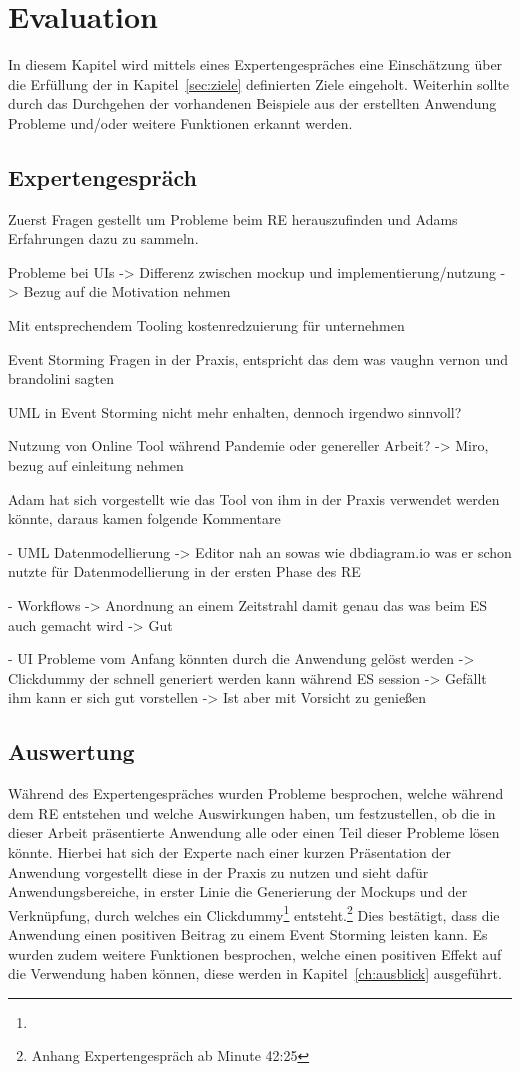 \chapter{Evaluation}\label{ch:evaluation}
In diesem Kapitel wird mittels eines Expertengespräches eine Einschätzung über die Erfüllung der in
Kapitel~\ref{sec:ziele} definierten Ziele eingeholt.
Weiterhin sollte durch das Durchgehen der vorhandenen Beispiele aus der erstellten Anwendung Probleme und/oder weitere
Funktionen erkannt werden.

\section{Expertengespräch}\label{sec:expertengespraech}
Zuerst Fragen gestellt um Probleme beim RE herauszufinden und Adams Erfahrungen dazu zu sammeln.

Probleme bei UIs -> Differenz zwischen mockup und implementierung/nutzung -> Bezug auf die Motivation nehmen

Mit entsprechendem Tooling kostenredzuierung für unternehmen

Event Storming Fragen in der Praxis, entspricht das dem was vaughn vernon und brandolini sagten

UML in Event Storming nicht mehr enhalten, dennoch irgendwo sinnvoll?

Nutzung von Online Tool während Pandemie oder genereller Arbeit? -> Miro, bezug auf einleitung nehmen

Adam hat sich vorgestellt wie das Tool von ihm in der Praxis verwendet werden könnte, daraus kamen folgende Kommentare

- UML Datenmodellierung -> Editor nah an sowas wie dbdiagram.io was er schon nutzte für Datenmodellierung in der ersten Phase des RE

- Workflows -> Anordnung an einem Zeitstrahl damit genau das was beim ES auch gemacht wird -> Gut

- UI Probleme vom Anfang könnten durch die Anwendung gelöst werden -> Clickdummy der schnell generiert werden kann während ES session -> Gefällt ihm kann er sich gut vorstellen -> Ist aber mit Vorsicht zu genießen

\section{Auswertung}\label{sec:auswertung}
Während des Expertengespräches wurden Probleme besprochen, welche während dem \ac{RE} entstehen und welche Auswirkungen haben, um festzustellen,
ob die in dieser Arbeit präsentierte Anwendung alle oder einen Teil dieser Probleme lösen könnte.
Hierbei hat sich der Experte nach einer kurzen Präsentation der Anwendung vorgestellt diese in der Praxis zu nutzen und sieht dafür
Anwendungsbereiche, in erster Linie die Generierung der Mockups und der Verknüpfung, durch welches ein
Clickdummy\footnote{}
entsteht.\footnote{Anhang Expertengespräch ab Minute 42:25}
Dies bestätigt, dass die Anwendung einen positiven Beitrag zu einem Event Storming leisten kann.
Es wurden zudem weitere Funktionen besprochen, welche einen positiven Effekt auf die Verwendung haben können, diese werden in Kapitel~\ref{ch:ausblick} ausgeführt.
